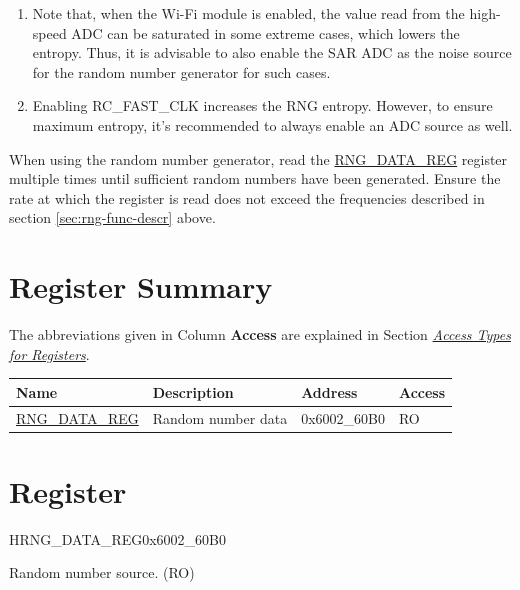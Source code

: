 \documentclass[main\_\_EN.tex]{subfiles}
\begin{document}
\begin{tiplisting}\label{others:rng-note-clock-seed}
\vspace{-2.5em}
\begin{enumerate}
    \item Note that, when the Wi-Fi module is enabled, the value read from the high-speed ADC can be saturated in some extreme cases, which lowers the entropy. Thus, it is advisable to also enable the SAR ADC as the noise source for the random number generator for such cases.
    \item Enabling RC\_FAST\_CLK increases the RNG entropy. However, to ensure maximum entropy, it's recommended to always enable an ADC source as well.
\end{enumerate}
\end{tiplisting}

When using the random number generator, read the \hyperref[regdesc:RNGDATAREG]{RNG\_DATA\_REG} register multiple times until sufficient random numbers have been generated. Ensure the rate at which the register is read does not exceed the frequencies described in section \ref{sec:rng-func-descr} above. 



\hypertarget{rng-reg-summ}{}
\section{Register Summary}

The abbreviations given in Column \textbf{Access} are explained in Section \hyperref[glossary-access-types]{\textit{Access Types for Registers}}.

\begin{table}[H]
    \centering
    \setlength{\extrarowheight}{0.3em}
        \begin{tabular}{ | l | l | l | l | }
    \hline
    \rowcolor{lightgray}
    \textbf{Name} & \textbf{Description} & \textbf{Address} & \textbf{Access} \\ \hline
    \hyperref[regdesc:RNGDATAREG]{RNG\_DATA\_REG} & Random number data & 0x6002\_60B0 & RO \\ \hline
    \end{tabular}
\end{table}

\section{Register}

\begin{register}{H}{RNG\_DATA\_REG}{0x6002\_60B0}\label{regdesc:RNGDATAREG}
%
\regnewline%
\begin{regdesc}\begin{reglist}
\item [RNG\_DATA] Random number source. (RO)
\end{reglist}\end{regdesc}
\end{register}
\end{document}
